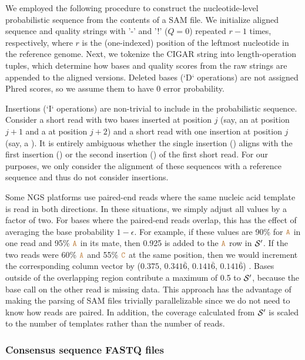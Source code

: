 \documentclass[10pt]{article}
\begin{document}
We employed the following procedure to construct the nucleotide-level probabilistic sequence from the contents of a SAM file.
We initialize aligned sequence and quality strings with '-' and '!' ($Q=0$) repeated $r-1$ times, respectively, where $r$ is the (one-indexed) position of the leftmost nucleotide in the reference genome.
Next, we tokenize the CIGAR string into length-operation tuples, which determine how bases and quality scores from the raw strings are appended to the aligned versions.
Deleted bases (`D` operations) are not assigned Phred scores, so we assume them to have 0 error probability.

Insertions (`I` operations) are non-trivial to include in the probabilistic sequence.
Consider a short read with two bases inserted at position $j$ (say, an  at position $j+1$ and a  at position $j+2$) and a short read with one insertion at position $j$ (say, a ).
It is entirely ambiguous whether the single insertion () aligns with the first insertion () or the second insertion () of the first short read. 
For our purposes, we only consider the alignment of these sequences with a reference sequence and thus do not consider insertions.

Some NGS platforms use paired-end reads where the same nucleic acid template is read in both directions.
In these situations, we simply adjust all values by a factor of two.
For bases where the paired-end reads overlap, this has the effect of averaging the base probability $1-\epsilon$.
For example, if these values are 90\% for $\texttt{\textcolor{brown}{A}}$ in one read and 95\% $\texttt{\textcolor{brown}{A}}$ in its mate, then 0.925 is added to the $\texttt{\textcolor{brown}{A}}$ row in $\mathcal{S}'$.
If the two reads were 60\% $\texttt{\textcolor{brown}{A}}$ and 55\% $\texttt{\textcolor{brown}{C}}$ at the same position, then we would increment the corresponding column vector by ($0.375$, $0.341\bar{6}$, $0.141\bar{6}$, $0.141\bar{6}$) .
Bases outside of the overlapping region contribute a maximum of 0.5 to $\mathcal{S}'$, because the base call on the other read is missing data.
This approach has the advantage of making the parsing of SAM files trivially parallelizable since we do not need to know how reads are paired.
In addition, the coverage calculated from $\mathcal{S}'$ is scaled to the number of templates rather than the number of reads.


\subsubsection{Consensus sequence FASTQ files}
\label{fastq_construction}
\end{document}
